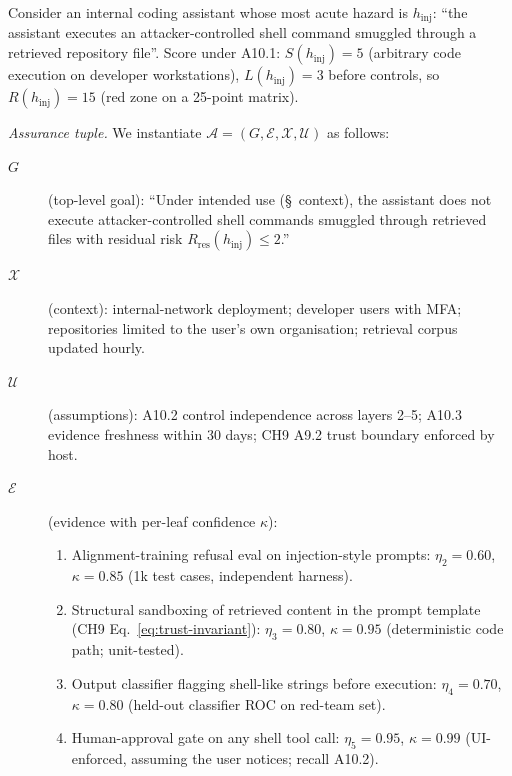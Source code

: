 \begin{workedexample}
Consider an internal coding assistant whose most
acute hazard is $h_\mathrm{inj}$: ``the assistant executes an
attacker-controlled shell command smuggled through a retrieved
repository file''. Score under A10.1:
$S(h_\mathrm{inj}) = 5$ (arbitrary code execution on developer
workstations), $L(h_\mathrm{inj}) = 3$ before controls, so
$R(h_\mathrm{inj}) = 15$ (red zone on a 25-point matrix).

\emph{Assurance tuple.} We instantiate $\mathcal{A} = (G, \mathcal{E}, \mathcal{X},
\mathcal{U})$ as follows:
\begin{description}
  \item[$G$] (top-level goal): ``Under intended use
    (\S~context), the assistant does not execute
    attacker-controlled shell commands smuggled through retrieved
    files with residual risk $R_\mathrm{res}(h_\mathrm{inj}) \le
    2$.''
  \item[$\mathcal{X}$] (context): internal-network deployment;
    developer users with MFA; repositories limited to the
    user's own organisation; retrieval corpus updated hourly.
  \item[$\mathcal{U}$] (assumptions): A10.2 control independence
    across layers 2--5; A10.3 evidence freshness within 30 days;
    CH9 A9.2 trust boundary enforced by host.
  \item[$\mathcal{E}$] (evidence with per-leaf confidence $\kappa$):
  \begin{enumerate}
    \item Alignment-training refusal eval on
      injection-style prompts: $\eta_2 = 0.60$,
      $\kappa = 0.85$ (1k test cases, independent harness).
    \item Structural sandboxing of retrieved content in the
      prompt template (CH9 Eq.~\eqref{eq:trust-invariant}):
      $\eta_3 = 0.80$, $\kappa = 0.95$ (deterministic code
      path; unit-tested).
    \item Output classifier flagging shell-like strings before
      execution: $\eta_4 = 0.70$, $\kappa = 0.80$ (held-out
      classifier ROC on red-team set).
    \item Human-approval gate on any shell tool call:
      $\eta_5 = 0.95$, $\kappa = 0.99$ (UI-enforced, assuming
      the user notices; recall A10.2).
  \end{enumerate}
\end{description}


\end{workedexample}
